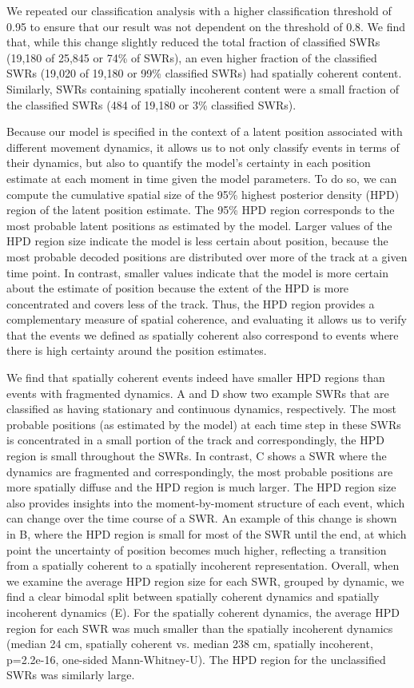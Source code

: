 \documentclass[9pt,lineno]{elife}
\begin{document}
We repeated our classification analysis with a higher classification threshold of 0.95 to ensure that our result was not dependent on the threshold of 0.8. We find that, while this change slightly reduced the total fraction of classified SWRs (19,180 of 25,845 or 74\% of SWRs), an even higher fraction of the classified SWRs (19,020 of 19,180 or 99\% classified SWRs) had spatially coherent content. Similarly, SWRs containing spatially incoherent content were a small fraction of the classified SWRs (484 of 19,180 or 3\% classified SWRs).

Because our model is specified in the context of a latent position associated with different movement dynamics, it allows us to not only classify events in terms of their dynamics, but also to quantify the model's certainty in each position estimate at each moment in time given the model parameters. To do so, we can compute the cumulative spatial size of the 95\% highest posterior density (HPD) region of the latent position estimate. The 95\% HPD region corresponds to the most probable latent positions as estimated by the model. Larger values of the HPD region size indicate the model is less certain about position, because the most probable decoded positions are distributed over more of the track at a given time point. In contrast, smaller values indicate that the model is more certain about the estimate of position because the extent of the HPD is more concentrated and covers less of the track. Thus, the HPD region provides a complementary measure of spatial coherence, and evaluating it allows us to verify that the events we defined as spatially coherent also correspond to events where there is high certainty around the position estimates. 

We find that spatially coherent events indeed have smaller HPD regions than events with fragmented dynamics. A and D show two example SWRs that are classified as having stationary and continuous dynamics, respectively. The most probable positions (as estimated by the model) at each time step in these SWRs is concentrated in a small portion of the track and correspondingly, the HPD region is small throughout the SWRs. In contrast, C shows a SWR where the dynamics are fragmented and correspondingly, the most probable positions are more spatially diffuse and the HPD region is much larger. The HPD region size also provides insights into the moment-by-moment structure of each event, which can change over the time course of a SWR. An example of this change is shown in B, where the HPD region is small for most of the SWR until the end, at which point the uncertainty of position becomes much higher, reflecting a transition from a spatially coherent to a spatially incoherent representation. Overall, when we examine the average HPD region size for each SWR, grouped by dynamic, we find a clear bimodal split between spatially coherent dynamics and spatially incoherent dynamics (E). For the spatially coherent dynamics, the average HPD region for each SWR was much smaller than the spatially incoherent dynamics (median 24 cm, spatially coherent vs. median 238 cm, spatially incoherent, p=2.2e-16, one-sided Mann-Whitney-U). The HPD region for the unclassified SWRs was similarly large.
\end{document}
